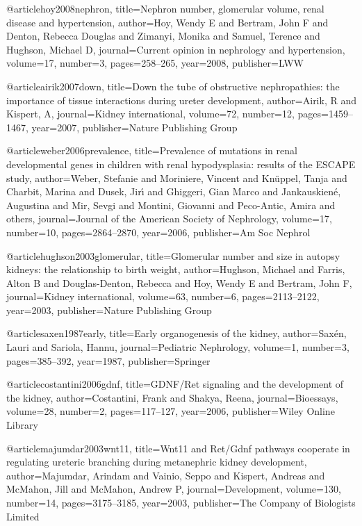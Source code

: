 @article{hoy2008nephron,
  title={Nephron number, glomerular volume, renal disease and hypertension},
  author={Hoy, Wendy E and Bertram, John F and Denton, Rebecca Douglas and Zimanyi, Monika and Samuel, Terence and Hughson, Michael D},
  journal={Current opinion in nephrology and hypertension},
  volume={17},
  number={3},
  pages={258--265},
  year={2008},
  publisher={LWW}
}

@article{airik2007down,
  title={Down the tube of obstructive nephropathies: the importance of tissue interactions during ureter development},
  author={Airik, R and Kispert, A},
  journal={Kidney international},
  volume={72},
  number={12},
  pages={1459--1467},
  year={2007},
  publisher={Nature Publishing Group}
}

@article{weber2006prevalence,
  title={Prevalence of mutations in renal developmental genes in children with renal hypodysplasia: results of the ESCAPE study},
  author={Weber, Stefanie and Moriniere, Vincent and Kn{\"u}ppel, Tanja and Charbit, Marina and Dusek, Jir{\'\i} and Ghiggeri, Gian Marco and Jankauskien{\'e}, Augustina and Mir, Sevgi and Montini, Giovanni and Peco-Antic, Amira and others},
  journal={Journal of the American Society of Nephrology},
  volume={17},
  number={10},
  pages={2864--2870},
  year={2006},
  publisher={Am Soc Nephrol}
}

@article{hughson2003glomerular,
  title={Glomerular number and size in autopsy kidneys: the relationship to birth weight},
  author={Hughson, Michael and Farris, Alton B and Douglas-Denton, Rebecca and Hoy, Wendy E and Bertram, John F},
  journal={Kidney international},
  volume={63},
  number={6},
  pages={2113--2122},
  year={2003},
  publisher={Nature Publishing Group}
}

@article{saxen1987early,
  title={Early organogenesis of the kidney},
  author={Sax{\'e}n, Lauri and Sariola, Hannu},
  journal={Pediatric Nephrology},
  volume={1},
  number={3},
  pages={385--392},
  year={1987},
  publisher={Springer}
}

@article{costantini2006gdnf,
  title={GDNF/Ret signaling and the development of the kidney},
  author={Costantini, Frank and Shakya, Reena},
  journal={Bioessays},
  volume={28},
  number={2},
  pages={117--127},
  year={2006},
  publisher={Wiley Online Library}
}

@article{majumdar2003wnt11,
  title={Wnt11 and Ret/Gdnf pathways cooperate in regulating ureteric branching during metanephric kidney development},
  author={Majumdar, Arindam and Vainio, Seppo and Kispert, Andreas and McMahon, Jill and McMahon, Andrew P},
  journal={Development},
  volume={130},
  number={14},
  pages={3175--3185},
  year={2003},
  publisher={The Company of Biologists Limited}
}


